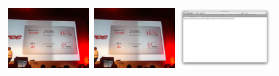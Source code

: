 \documentclass{acm_proc_article-sp}
\newcommand{\thumbheight}{16mm}
\newenvironment{thumbsequence}{}{\makebox[4mm]{}}
\begin{document}
\begin{figure}
\begin{centering}
	\begin{thumbsequence}
		\includegraphics[height=\thumbheight]{resources/free/exactduplicate1.jpg}
		\includegraphics[height=\thumbheight]{resources/free/exactduplicate2.jpg}
	\end{thumbsequence}
	\begin{thumbsequence}
		\includegraphics[height=\thumbheight]{resources/free/looseduplicate1.png}

\end{thumbsequence}
\end{centering}
\end{figure}
\end{document}
